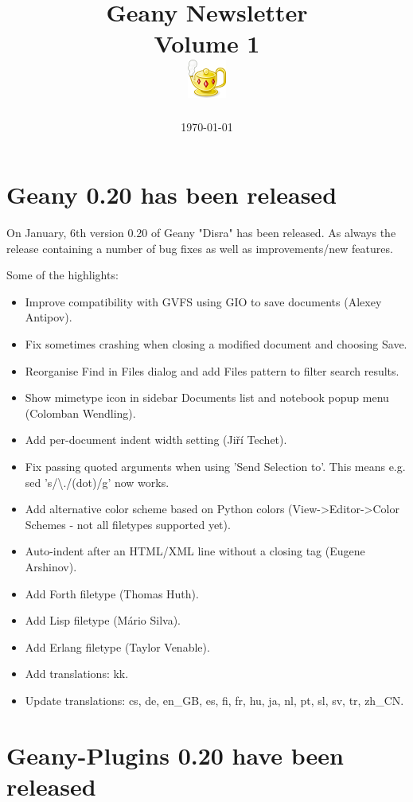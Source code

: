 \documentclass[%
paper=a4,%
fontsize=11pt,%
twoside=false,%
DIV18,
headsepline,
plainheadsepline,
footsepline,
plainfootsepline,
parskip=half,%
openany,%
]{scrartcl}
\title{Geany Newsletter \\[1ex]
	\small{Volume 1} \\[1ex]
	\includegraphics{img/geany.png}}
\date{\today}
\begin{document}
\maketitle{}
\tableofcontents{}

\section{Geany 0.20 has been released}

On January, 6th version 0.20 of Geany "Disra" has been released. As always
the release containing a number of bug fixes as well as
improvements/new features.

Some of the highlights:

\begin{itemize}
	\item Improve compatibility with GVFS using GIO to save documents (Alexey Antipov).
	\item Fix sometimes crashing when closing a modified document and choosing Save.
	\item Reorganise Find in Files dialog and add Files pattern to filter search results.
	\item Show mimetype icon in sidebar Documents list and notebook popup menu (Colomban Wendling).
	\item Add per-document indent width setting (Jiří Techet).
	\item Fix passing quoted arguments when using 'Send Selection to'. This means e.g. sed 's/\textbackslash{}./(dot)/g' now works.
	\item Add alternative color scheme based on Python colors (View->Editor->Color Schemes - not all filetypes supported yet).
	\item Auto-indent after an HTML/XML line without a closing tag (Eugene Arshinov).
	\item Add Forth filetype (Thomas Huth).
	\item Add Lisp filetype (Mário Silva).
	\item Add Erlang filetype (Taylor Venable).
	\item Add translations: kk.
	\item Update translations: cs, de, en\_GB, es, fi, fr, hu, ja, nl, pt, sl, sv, tr, zh\_CN.
\end{itemize}

\section{Geany-Plugins 0.20 have been released}
\end{document}
